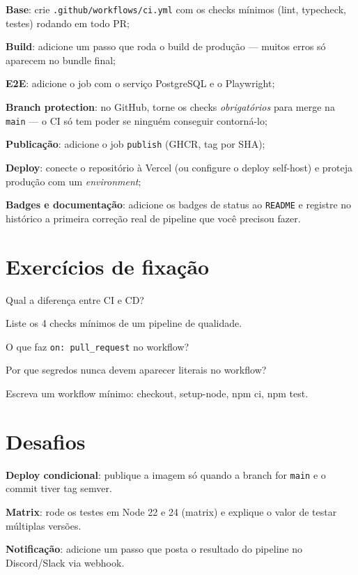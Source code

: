 \begin{passos}
  \item \textbf{Base}: crie \texttt{.github/workflows/ci.yml} com os checks
  mínimos (lint, typecheck, testes) rodando em todo PR;
  \item \textbf{Build}: adicione um passo que roda o build de produção —
  muitos erros só aparecem no bundle final;
  \item \textbf{E2E}: adicione o job com o serviço PostgreSQL e o Playwright;
  \item \textbf{Branch protection}: no GitHub, torne os checks
  \emph{obrigatórios} para merge na \texttt{main} — o CI só tem poder se
  ninguém conseguir contorná-lo;
  \item \textbf{Publicação}: adicione o job \texttt{publish} (GHCR, tag por SHA);
  \item \textbf{Deploy}: conecte o repositório à Vercel (ou configure o deploy
  self-host) e proteja produção com um \emph{environment};
  \item \textbf{Badges e documentação}: adicione os badges de status ao
  \texttt{README} e registre no histórico a primeira correção real de
  pipeline que você precisou fazer.
\end{passos}

\section{Exercícios de fixação}

\begin{exercicios}
  \item Qual a diferença entre CI e CD?
  \item Liste os 4 checks mínimos de um pipeline de qualidade.
  \item O que faz \texttt{on: pull\_request} no workflow?
  \item Por que segredos nunca devem aparecer literais no workflow?
  \item Escreva um workflow mínimo: checkout, setup-node, npm ci, npm test.
\end{exercicios}

\section{Desafios}

\begin{desafios}
  \item \textbf{Deploy condicional}: publique a imagem só quando a branch for \texttt{main} e o commit tiver tag semver.
  \item \textbf{Matrix}: rode os testes em Node 22 e 24 (matrix) e explique o valor de testar múltiplas versões.
  \item \textbf{Notificação}: adicione um passo que posta o resultado do pipeline no Discord/Slack via webhook.
\end{desafios}

